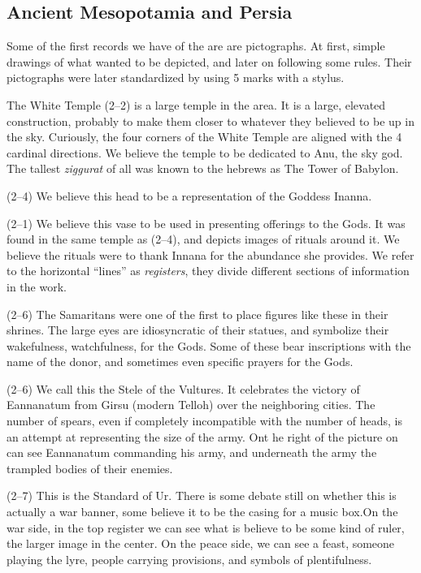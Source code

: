 \documentclass{article}
\begin{document}
    \begin{spacing}{1.2}
    \newpage
    \section{Ancient Mesopotamia and Persia}
    Some of the first records we have of the are are pictographs. At first, 
    simple drawings of what wanted to be depicted, and later on following some
    rules. Their pictographs were later standardized by using 5 marks with a
    stylus.

    The White Temple (2--2) is a large temple in the area. It is a large,
    elevated construction, probably to make them closer to whatever they
    believed to be up in the sky. Curiously, the four corners of the White 
    Temple are aligned with the 4 cardinal directions. We believe the temple
    to be dedicated to Anu, the sky god. The tallest \emph{ziggurat} of all
    was known to the hebrews as The Tower of Babylon.
    
    (2--4) We believe this head to be a representation of the Goddess Inanna.

    (2--1) We believe this vase to be used in presenting offerings to the Gods.
    It was found in the same temple as (2--4), and depicts images of rituals 
    around it. We believe the rituals were to thank Innana for the abundance
    she provides. We refer to the horizontal ``lines'' as \emph{registers},
    they divide different sections of information in the work.
    
    (2--6) The Samaritans were one of the first to place figures like these in
    their shrines. The large eyes are idiosyncratic of their statues, and 
    symbolize their wakefulness, watchfulness, for the Gods. Some of these 
    bear inscriptions with the name of the donor, and sometimes even specific
    prayers for the Gods.
    
    (2--6) We call this the Stele of the Vultures. It celebrates the victory of 
    Eannanatum from Girsu (modern Telloh) over the neighboring cities. The
    number of spears, even if completely incompatible with the number of heads,
    is an attempt at representing the size of the army. Ont he right of the
    picture on can see Eannanatum commanding his army, and underneath the army
    the trampled bodies of their enemies.

    (2--7) This is the Standard of Ur. There is some debate still on whether
    this is actually a war banner, some believe it to be the casing for a
    music box.On the war side, in the top register we can see what is believe
    to be some kind of ruler, the larger image in the center. On the peace
    side, we can see a feast, someone playing the lyre, people carrying
    provisions, and symbols of plentifulness.


\end{spacing}
\end{document}

